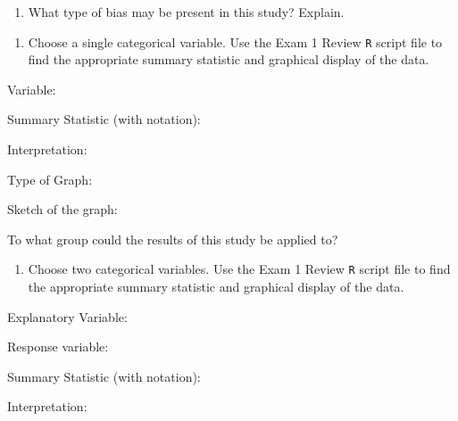 \documentclass[
]{report}
\providecommand{\tightlist}{%
  \setlength{\itemsep}{0pt}\setlength{\parskip}{0pt}}
\newcommand{\rgi}{\hspace{24pt}}  %
\begin{document}
\vspace{0.8in}

\begin{enumerate}
\def\labelenumi{\arabic{enumi}.}
\setcounter{enumi}{3}
\tightlist
\item
  What type of bias may be present in this study? Explain.
\end{enumerate}

\vspace{0.5in}

\begin{enumerate}
\def\labelenumi{\arabic{enumi}.}
\setcounter{enumi}{4}
\tightlist
\item
  Choose a single categorical variable. Use the Exam 1 Review \texttt{R} script file to find the appropriate summary statistic and graphical display of the data.
\end{enumerate}

\rgi Variable:

\rgi Summary Statistic (with notation):

\rgi \rgi Interpretation:

\vspace{0.3in}

\rgi Type of Graph:

\vspace{0.3in}

\rgi Sketch of the graph:

\vspace{2in}

\rgi To what group could the results of this study be applied to?

\vspace{0.3in}

\newpage

\begin{enumerate}
\def\labelenumi{\arabic{enumi}.}
\setcounter{enumi}{5}
\tightlist
\item
  Choose two categorical variables. Use the Exam 1 Review \texttt{R} script file to find the appropriate summary statistic and graphical display of the data.
\end{enumerate}

\rgi Explanatory Variable:

\rgi Response variable:

\rgi Summary Statistic (with notation):

\rgi \rgi Interpretation:

\vspace{0.3in}
\end{document}
